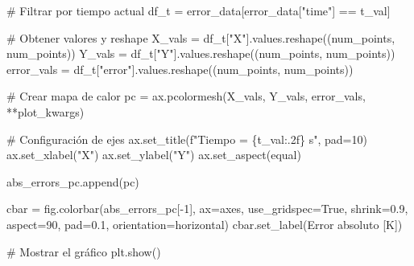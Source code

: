 \documentclass[
  spanish,
  us-letterpaper,
  DIV=11,
  numbers=noendperiod]{scrreprt}
\newenvironment{Shaded}{\begin{snugshade}}{\end{snugshade}}
\newcommand{\CommentTok}[1]{\textcolor[rgb]{0.37,0.37,0.37}{#1}}
\newcommand{\DecValTok}[1]{\textcolor[rgb]{0.68,0.00,0.00}{#1}}
\newcommand{\FloatTok}[1]{\textcolor[rgb]{0.68,0.00,0.00}{#1}}
\newcommand{\NormalTok}[1]{\textcolor[rgb]{0.00,0.23,0.31}{#1}}
\newcommand{\OperatorTok}[1]{\textcolor[rgb]{0.37,0.37,0.37}{#1}}
\newcommand{\SpecialCharTok}[1]{\textcolor[rgb]{0.37,0.37,0.37}{#1}}
\newcommand{\SpecialStringTok}[1]{\textcolor[rgb]{0.13,0.47,0.30}{#1}}
\newcommand{\StringTok}[1]{\textcolor[rgb]{0.13,0.47,0.30}{#1}}
\newcommand{\VariableTok}[1]{\textcolor[rgb]{0.07,0.07,0.07}{#1}}
\theoremstyle{plain}
\theoremstyle{definition}
\theoremstyle{remark}
\begin{document}
\begin{Shaded}
\begin{Highlighting}[]
    \CommentTok{\# Filtrar por tiempo actual}
\NormalTok{    df\_t }\OperatorTok{=}\NormalTok{ error\_data[error\_data[}\StringTok{"time"}\NormalTok{] }\OperatorTok{==}\NormalTok{ t\_val]}
    
    \CommentTok{\# Obtener valores y reshape}
\NormalTok{    X\_vals }\OperatorTok{=}\NormalTok{ df\_t[}\StringTok{"X"}\NormalTok{].values.reshape((num\_points, num\_points))}
\NormalTok{    Y\_vals }\OperatorTok{=}\NormalTok{ df\_t[}\StringTok{"Y"}\NormalTok{].values.reshape((num\_points, num\_points))}
\NormalTok{    error\_vals }\OperatorTok{=}\NormalTok{ df\_t[}\StringTok{"error"}\NormalTok{].values.reshape((num\_points, num\_points))}
    
    \CommentTok{\# Crear mapa de calor}
\NormalTok{    pc }\OperatorTok{=}\NormalTok{ ax.pcolormesh(X\_vals, Y\_vals, error\_vals, }\OperatorTok{**}\NormalTok{plot\_kwargs)}
    
    \CommentTok{\# Configuración de ejes}
\NormalTok{    ax.set\_title(}\SpecialStringTok{f"Tiempo = }\SpecialCharTok{\{}\NormalTok{t\_val}\SpecialCharTok{:.2f\}}\SpecialStringTok{ s"}\NormalTok{, pad}\OperatorTok{=}\DecValTok{10}\NormalTok{)}
\NormalTok{    ax.set\_xlabel(}\StringTok{"X"}\NormalTok{)}
\NormalTok{    ax.set\_ylabel(}\StringTok{"Y"}\NormalTok{)}
\NormalTok{    ax.set\_aspect(}\StringTok{\textquotesingle{}equal\textquotesingle{}}\NormalTok{)}

\NormalTok{    abs\_errors\_pc.append(pc)}

\NormalTok{cbar }\OperatorTok{=}\NormalTok{ fig.colorbar(abs\_errors\_pc[}\OperatorTok{{-}}\DecValTok{1}\NormalTok{], ax}\OperatorTok{=}\NormalTok{axes,}
\NormalTok{                    use\_gridspec}\OperatorTok{=}\VariableTok{True}\NormalTok{, shrink}\OperatorTok{=}\FloatTok{0.9}\NormalTok{,}
\NormalTok{                    aspect}\OperatorTok{=}\DecValTok{90}\NormalTok{, pad}\OperatorTok{=}\FloatTok{0.1}\NormalTok{, orientation}\OperatorTok{=}\StringTok{\textquotesingle{}horizontal\textquotesingle{}}\NormalTok{)}
\NormalTok{cbar.set\_label(}\StringTok{\textquotesingle{}Error absoluto [K]\textquotesingle{}}\NormalTok{)}

\CommentTok{\# Mostrar el gráfico}
\NormalTok{plt.show()}
\end{Highlighting}
\end{Shaded}
\end{document}
